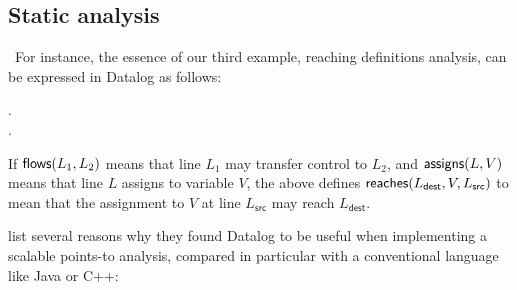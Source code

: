 
\subsection{Static analysis}

\XXX\ For instance, the essence of our third example, reaching definitions
analysis, can be expressed in Datalog as follows:

\begin{datalog}
   \gets {}.
  \\
  \gets
  \neg{}
  \conj
  \conj 
  .
\end{datalog}

\noindent
If $\text{\sffamily flows}({L_1, L_2})$ means that line $L_1$ may transfer control to $L_2$,
and $\text{\sffamily assigns}({L, V})$ means that line $L$ assigns to variable $V$, the
above defines $\text{\sffamily reaches}({L_{\textsf{dest}}, V, L_{\textsf{src}}})$ to mean
that the assignment to $V$ at line $L_{\textsf{src}}$ may reach
$L_{\textsf{dest}}$.


\citet{DBLP:conf/datalog/SmaragdakisB10} list several reasons why they found
Datalog to be useful when implementing a scalable points-to analysis, compared
in particular with a conventional language like Java or C++:

